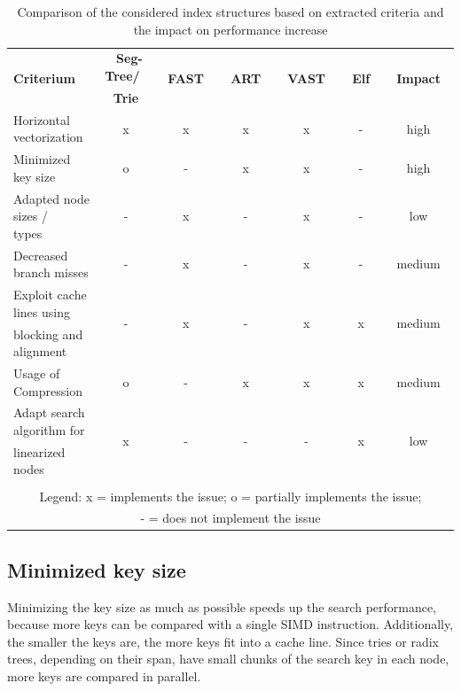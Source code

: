 \documentclass[runningheads,a4paper]{llncs}
\begin{document}
\begin{table}[htbp]
\footnotesize
	\begin{center}
		\begin{tabular}{l|c|c|c|c|c|c}
			\hline
			\multirow{2}{*}{\textbf{Criterium}}&\textbf{~Seg-Tree/~}&\multirow{2}{*}{\textbf{~FAST~}}&\multirow{2}{*}{\textbf{~ART~}}&\multirow{2}{*}{\textbf{~VAST~}}&\multirow{2}{*}{\textbf{~Elf~}}&\multirow{2}{*}{\textbf{~Impact~}}\\
			&\textbf{Trie}&&&&&\\
			\hline
			Horizontal vectorization & x & x & x & x & - &high\\[.1cm]
			Minimized key size & o & - & x & x & - &high\\[.1cm]
			Adapted node sizes / types~~& - & x & - & x & - &low\\[.1cm]
			Decreased branch misses & - & x & - & x & - &medium\\[.1cm]
			Exploit cache lines using& \multirow{2}{*}{-} &  \multirow{2}{*}{x} &  \multirow{2}{*}{-} &  \multirow{2}{*}{x} &  \multirow{2}{*}{x}  &\multirow{2}{*}{medium}\\
			 blocking and alignment &&&&&&\\[.1cm]
			Usage of Compression & o & - & x & x & x &medium\\[.1cm]
			Adapt search algorithm for &  \multirow{2}{*}{x}  &  \multirow{2}{*}{-} &  \multirow{2}{*}{-}  &  \multirow{2}{*}{-}  & \multirow{2}{*}{x}  &  \multirow{2}{*}{low} \\
			 linearized nodes &&&&&&\\
			 \multicolumn{7}{c}{}\\
			\hline
			\multicolumn{7}{|c|}{Legend: x = implements the issue; o = partially implements the issue;}\\
			\multicolumn{7}{|c|}{ - = does not implement the issue}\\
			\hline
		\end{tabular}
	\caption{Comparison of the considered index structures based on extracted criteria and the impact on performance increase}
		\label{tasuaib2011architecture}
	\end{center}
\end{table}%

\subsection{Minimized key size}
Minimizing the key size as much as possible speeds up the search performance, because more keys can be compared with a single SIMD instruction. Additionally, the smaller the keys are, the more keys fit into a cache line. Since tries or radix trees, depending on their span, have small chunks of the search key in each node, more keys are compared in parallel.
\end{document}
